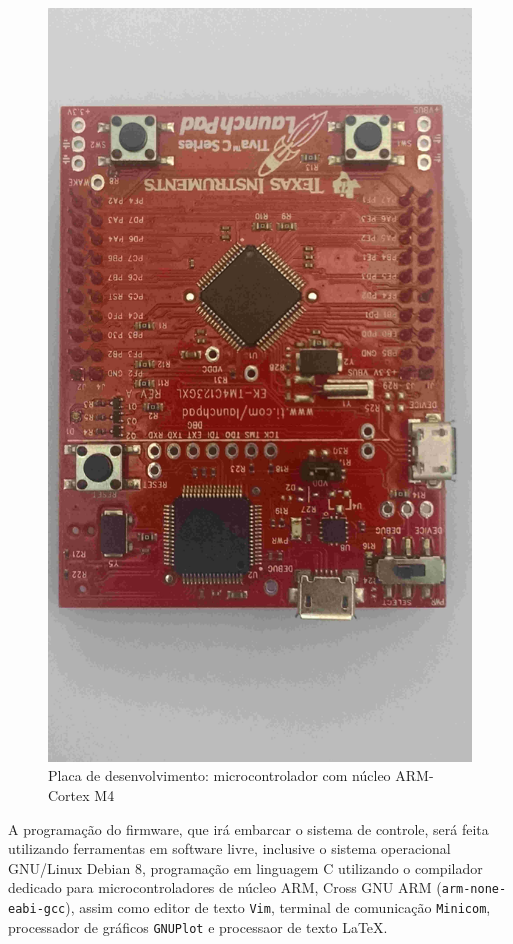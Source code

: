 \begin{figure}[!htb]
\center\includegraphics[scale=0.08, angle=180, clip=true, trim=0 750 60 500]{./imagens/uC-ARM.jpg}
\caption{Placa de desenvolvimento: microcontrolador com núcleo ARM-Cortex M4}
\label{fig:uCarm}
\end{figure}

A programação do firmware, que irá embarcar o sistema de controle, será feita utilizando ferramentas em software livre, inclusive o sistema operacional GNU/Linux Debian 8, programação em linguagem C utilizando o compilador dedicado para microcontroladores de núcleo ARM, Cross GNU ARM (\texttt{arm-none-eabi-gcc}), assim como editor de texto \texttt{Vim}, terminal de comunicação \texttt{Minicom}, processador de gráficos \texttt{GNUPlot} e processaor de texto \LaTeX.









